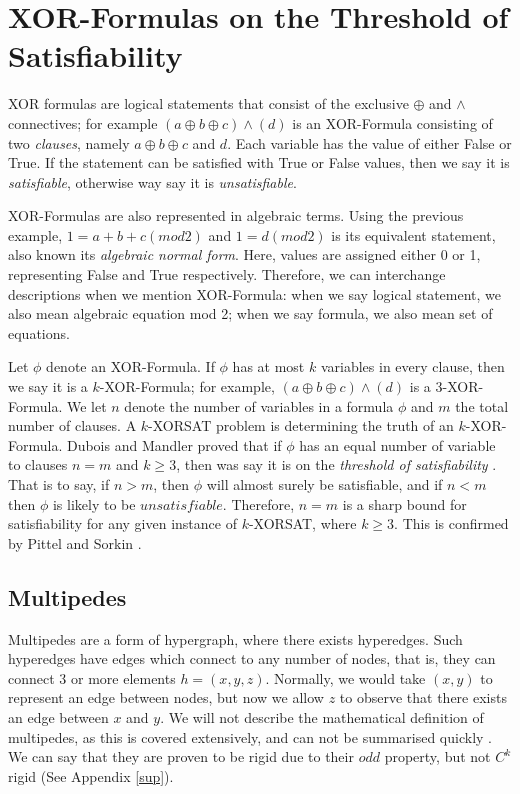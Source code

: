 \section{XOR-Formulas on the Threshold of Satisfiability}
XOR formulas are logical statements that consist of the exclusive $\oplus$ and $\land$ connectives; for example $(a\oplus b \oplus c) \land (d)$ is an XOR-Formula consisting of two \emph{clauses}, namely $a\oplus b \oplus c$ and $d$. Each variable has the value of either False or True. If the statement can be satisfied with True or False values, then we say it is  \emph{satisfiable}, otherwise way say it is \emph{unsatisfiable}.
\par
XOR-Formulas are also represented in algebraic terms. Using the previous example, $1=a+b+c (mod 2)$ and $1=d (mod 2)$ is its equivalent statement, also known its \emph{algebraic normal form}. Here, values are assigned either 0 or 1, representing False and True respectively. Therefore, we can interchange descriptions when we mention XOR-Formula: when we say logical statement, we also mean algebraic equation mod 2; when we say formula, we also mean set of equations.
\par
Let $\phi$ denote an XOR-Formula. If $\phi$ has at most $k$ variables in every clause, then we say it is a $k$-XOR-Formula; for example, $(a\oplus b \oplus c) \land (d)$ is a 3-XOR-Formula. We let $n$ denote the number of variables in a formula $\phi$ and $m$ the total number of clauses. A $k$-XORSAT problem is determining the truth of an $k$-XOR-Formula. Dubois and Mandler proved that if $\phi$ has an equal number of variable to clauses $n=m$ and $k\geq3$, then was say it is on the \emph{threshold of satisfiability} \cite{dubois20023}. That is to say, if $n>m$, then $\phi$ will almost surely be satisfiable, and if $n<m$ then $\phi$ is likely to be $unsatisfiable$. Therefore, $n=m$ is a sharp bound for satisfiability for any given instance of $k$-XORSAT, where $k\geq3$. This is confirmed by Pittel and Sorkin \cite{pittel2016satisfiability}.

\subsection{Multipedes}
Multipedes are a form of hypergraph, where there exists hyperedges. Such hyperedges have edges which connect to any number of nodes, that is, they can connect 3 or more elements $h=(x,y,z)$. Normally, we would take $(x,y)$ to represent an edge between nodes, but now we allow $z$ to observe that there exists an edge between $x$ and $y$. We will not describe the mathematical definition of multipedes, as this is covered extensively, and can not be summarised quickly \cite{gurevich1996finite}. We can say that they are proven to be rigid due to their $odd$ property, but not $C^{k}$ rigid (See Appendix \ref{sup}).

